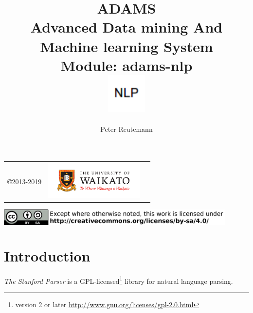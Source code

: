 \documentclass[a4paper]{book}
\title{
  \textbf{ADAMS} \\
  {\Large \textbf{A}dvanced \textbf{D}ata mining \textbf{A}nd \textbf{M}achine
  learning \textbf{S}ystem} \\
  {\Large Module: adams-nlp} \\
  \vspace{1cm}
  \includegraphics[width=2cm]{images/nlp-module.png} \\
}
\author{
  Peter Reutemann
}
\begin{document}
\begin{titlepage}
\maketitle

\thispagestyle{empty}
\center
\begin{table}[b]
	\begin{tabular}{c l l}
		\parbox[c][2cm]{2cm}{\copyright 2013-2019} &
		\parbox[c][2cm]{5cm}{\includegraphics[width=5cm]{images/coat_of_arms.pdf}} \\
	\end{tabular}
	\includegraphics[width=12cm]{images/cc.png} \\
\end{table}

\end{titlepage}

\tableofcontents
\listoffigures

\chapter{Introduction}
\textit{The Stanford Parser} is a GPL-licensed\footnote{version 2 or later \url{http://www.gnu.org/licenses/gpl-2.0.html}{}} 
library for natural language parsing.
\end{document}

